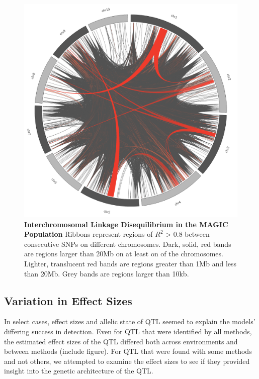 \documentclass[article,9pt,twocolumn,twoside]{rilabRxiv}
\begin{document}
\begin{figure}[ht]
\centering
\includegraphics[width=\linewidth]{figures/circos.png}
\caption{\textbf{Interchromosomal Linkage Disequilibrium in the MAGIC Population} Ribbons represent regions of $R^2$ > 0.8 between consecutive SNPs on different chromosomes. Dark, solid, red bands are regions larger than 20Mb on at least on of the chromosomes. Lighter, translucent red bands are regions greater than 1Mb and less than 20Mb. Grey bands are regions larger than 10kb.}
\label{fig:circosfigure}
\end{figure}

\subsection{Variation in Effect Sizes}
In select cases, effect sizes and allelic state of QTL seemed to explain the models' differing success in detection.
Even for QTL that were identified by all methods, the estimated effect sizes of the QTL differed both across environments and between methods (include figure).
For QTL that were found with some methods and not others, we attempted to examine the effect sizes to see if they provided insight into the genetic architecture of the QTL.
\end{document}
